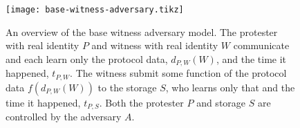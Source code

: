 \begin{figure}
  \centering
  \texttt{[image: base-witness-adversary.tikz]}
  \caption{\label{fig:witness-adversary}%
    An overview of the base witness adversary model.
    The protester with real identity \(P\) and witness with real identity \(W\) 
    communicate and each learn only the protocol data, \(d_{P,W}(W)\), and the 
    time it happened, \(t_{P,W}\).
    The witness submit some function of the protocol data \(f(d_{P,W}(W))\) to 
    the storage \(S\), who learns only that and the time it happened, 
    \(t_{P,S}\).
    Both the protester \(P\) and storage \(S\) are controlled by the adversary 
    \(A\).
  }
\end{figure}


